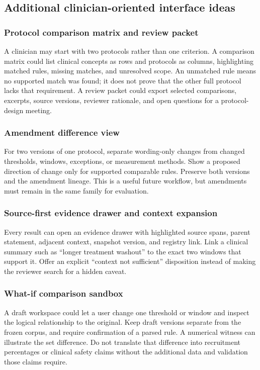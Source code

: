 \documentclass[10pt,letterpaper]{article}
\begin{document}
\subsection{Additional clinician-oriented interface ideas}
\subsubsection{Protocol comparison matrix and review packet}
A clinician may start with two protocols rather than one criterion. A
comparison matrix could list clinical concepts as rows and protocols as
columns, highlighting matched rules, missing matches, and unresolved scope.
An unmatched rule means no supported match was found; it does not prove that
the other full protocol lacks that requirement. A review packet could export
selected comparisons, excerpts, source versions, reviewer rationale, and open
questions for a protocol-design meeting.

\subsubsection{Amendment difference view}
For two versions of one protocol, separate wording-only changes from changed
thresholds, windows, exceptions, or measurement methods. Show a proposed
direction of change only for supported comparable rules. Preserve both
versions and the amendment lineage. This is a useful future workflow, but
amendments must remain in the same family for evaluation.

\subsubsection{Source-first evidence drawer and context expansion}
Every result can open an evidence drawer with highlighted source spans, parent
statement, adjacent context, snapshot version, and registry link. Link a
clinical summary such as ``longer treatment washout'' to the exact two windows
that support it. Offer an explicit ``context not sufficient'' disposition
instead of making the reviewer search for a hidden caveat.

\subsubsection{What-if comparison sandbox}
A draft workspace could let a user change one threshold or window and inspect
the logical relationship to the original. Keep draft versions separate from
the frozen corpus, and require confirmation of a parsed rule. A numerical
witness can illustrate the set difference. Do not translate that difference
into recruitment percentages or clinical safety claims without the additional
data and validation those claims require.
\end{document}
